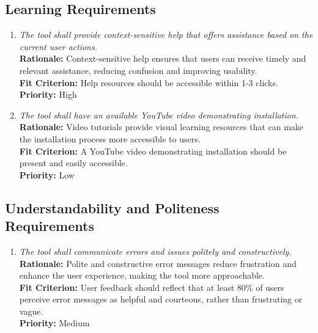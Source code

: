 \documentclass[12pt]{article}
\begin{document}
\subsection{Learning Requirements}
\begin{enumerate}[label=UHR-LRN \arabic*., wide=0pt, leftmargin=*]
    \item \emph{The tool shall provide context-sensitive help that offers assistance based on the current user actions.}\\[2mm]
    {\bf Rationale:} Context-sensitive help ensures that users can receive timely and relevant assistance, reducing confusion and improving usability.\\
    {\bf Fit Criterion:} Help resources should be accessible within 1-3 clicks.\\
    {\bf Priority:} High
    \item \emph{The tool shall have an available YouTube video demonstrating installation.}\\[2mm]
    {\bf Rationale:} Video tutorials provide visual learning resources that can make the installation process more accessible to users.\\
    {\bf Fit Criterion:} A YouTube video demonstrating installation should be present and easily accessible.\\
    {\bf Priority:} Low
\end{enumerate}

\subsection{Understandability and Politeness Requirements}
\begin{enumerate}[label=UHR-UPL \arabic*., wide=0pt, leftmargin=*]
    \item \emph{The tool shall communicate errors and issues politely and constructively.}\\[2mm]
    {\bf Rationale:} Polite and constructive error messages reduce frustration and enhance the user experience, making the tool more approachable.\\
    {\bf Fit Criterion:} User feedback should reflect that at least 80\% of users perceive error messages as helpful and courteous, rather than frustrating or vague.\\
    {\bf Priority:} Medium
\end{enumerate}
\end{document}

